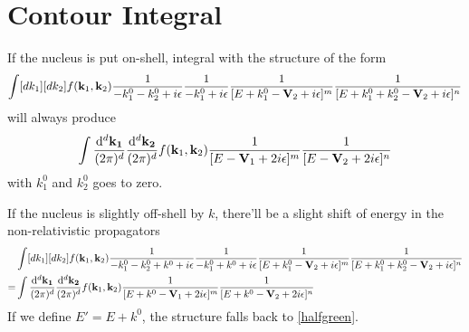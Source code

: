 \documentclass[aps,prd,preprint,showkeys,10pt]{revtex4-1}
\begin{document}
	\section{\label{appendix:contour}Contour Integral}
	
	If the nucleus is put on-shell, integral with the structure of the form
	\begin{align}
		\int[dk_1][dk_2]f(\vb{k}_1,\vb{k}_2)\frac{1}{-k_1^0-k_2^0+i\epsilon}\frac{1}{-k_1^0+i\epsilon}\frac{1}{[E+k_1^0-\vb{V}_2+i\epsilon]^m}\frac{1}{[E+k_1^0+k_2^0-\vb{V}_2+i\epsilon]^n}\label{pretemporal}
	\end{align}
	will always produce
	\begin{align}
		\int\frac{\dd^d\vb{k_1}}{(2\pi)^d}\frac{\dd^d\vb{k_2}}{(2\pi)^d}f(\vb{k}_1,\vb{k}_2)\frac{1}{[E-\vb{V}_1+2i\epsilon]^m}\frac{1}{[E-\vb{V}_2+2i\epsilon]^n}\label{halfgreen}
	\end{align}
	with $k_1^0$ and $k_2^0$ goes to zero.

	If the nucleus is slightly off-shell by $k$, there'll be a slight shift of energy in the non-relativistic propagators
	\begin{align*}
		  & \int[dk_1][dk_2]f(\vb{k}_1,\vb{k}_2)\frac{1}{-k_1^0-k_2^0+k^0+i\epsilon}\frac{1}{-k_1^0+k^0+i\epsilon}\frac{1}{[E+k_1^0-\vb{V}_2+i\epsilon]^m}\frac{1}{[E+k_1^0+k_2^0-\vb{V}_2+i\epsilon]^n} \\
		= & \int\frac{\dd^d\vb{k_1}}{(2\pi)^d}\frac{\dd^d\vb{k_2}}{(2\pi)^d}f(\vb{k}_1,\vb{k}_2)\frac{1}{[E+k^0-\vb{V}_1+2i\epsilon]^m}\frac{1}{[E+k^0-\vb{V}_2+2i\epsilon]^n}
	\end{align*}
	If we define $E'=E+k^0$, the structure falls back to \eqref{halfgreen}.
\end{document}
